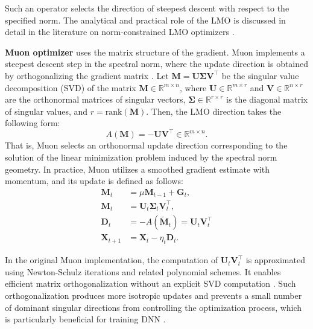 \documentclass{article}
\begin{document}
Such an operator selects the direction of steepest descent with respect to the specified norm. The analytical and practical role of the LMO is discussed in detail in the literature on norm-constrained LMO optimizers \cite{pethick2025training, kovalev2025understanding, riabinin2025gluon}.

\textbf{Muon optimizer} uses the matrix structure of the gradient. Muon implements a steepest descent step in the spectral norm, where the update direction is obtained by orthogonalizing the gradient matrix  \cite{bernstein2024old}. Let $\mathbf{M}=\mathbf{U}\boldsymbol{\Sigma}\mathbf{V}^\top$ be the singular value decomposition (SVD) of the matrix $\mathbf{M}\in\mathbb{R}^{m\times n}$, where $\mathbf{U}\in\mathbb{R}^{m\times r}$ and  $\mathbf{V}\in\mathbb{R}^{n\times r}$ are the orthonormal matrices of singular vectors, $\boldsymbol{\Sigma}\in\mathbb{R}^{r\times r}$ is the diagonal matrix of singular values, and $r=\mathrm{rank}(\mathbf{M})$. Then, the LMO direction takes the following form:
\begin{equation}
A(\mathbf{M})=-\mathbf{U}\mathbf{V}^\top \in \mathbb{R}^{m\times n}.
\end{equation}
That is, Muon selects an orthonormal update direction corresponding to the solution of the linear minimization problem induced by the spectral norm geometry. In practice, Muon utilizes a smoothed gradient estimate with momentum, and its update is defined as follows: 
\begin{equation}
    \begin{aligned}
        \mathbf{M}_t &= \mu \mathbf{M}_{t-1} + \mathbf{G}_t, \\
        \mathbf{M}_t &= \mathbf{U}_t \boldsymbol{\Sigma}_t \mathbf{V}_t^\top, \\
        \mathbf{D}_t &= -A(\tilde{\mathbf{M}}_t) = \mathbf{U}_t\mathbf{V}_t^\top\\
        \mathbf{X}_{t+1} &= \mathbf{X}_t - \eta_t \mathbf{D}_t.
    \end{aligned}
\end{equation}

In the original Muon implementation, the computation of $\mathbf{U}_t\mathbf{V}_t^\top$ is approximated using Newton-Schulz iterations and related polynomial schemes. It enables efficient matrix orthogonalization without an explicit SVD computation \cite{amsel2025polar, li2025note, liu2025muon}. Such orthogonalization produces more isotropic updates and prevents a small number of dominant singular directions from controlling the optimization process, which is particularly beneficial for training DNN \cite{bernstein2024old, shah2025practical}.
\end{document}

